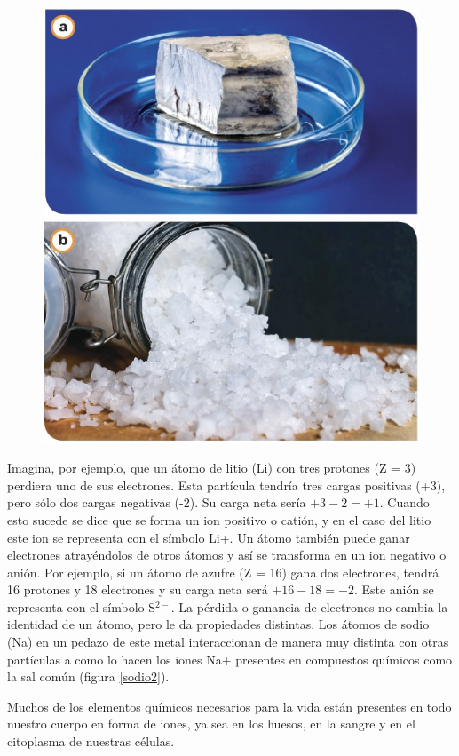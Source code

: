 \documentclass[11pt]{book}
\begin{document}
\begin{figure}[H]
  \centering
  \includegraphics[width=0.45\linewidth]{sodio.jpg}\includegraphics[width=0.45\linewidth]{sodio2.jpg}
  \label{fig:sodio2}
\end{figure}%

Imagina, por ejemplo, que un átomo de litio (Li) con tres protones (Z = 3) perdiera uno de sus electrones.
Esta partícula tendría tres cargas positivas (+3), pero sólo dos cargas negativas (-2).
Su carga neta sería $+3 - 2 = +1$. Cuando esto sucede se dice que se forma un ion positivo o catión,
y en el caso del litio este ion se representa con el símbolo Li+. Un átomo también puede ganar electrones
atrayéndolos de otros átomos y así se transforma en un ion negativo o anión. Por ejemplo, si un átomo de
azufre (Z = 16) gana dos electrones, tendrá 16 protones y 18 electrones y su carga neta será $+16 - 18 = -2$.
Este anión se representa con el símbolo S$^{2-}$. La pérdida o ganancia de electrones no cambia la identidad de un
átomo, pero le da propiedades distintas. Los átomos de sodio (Na) en un pedazo de este metal interaccionan de
manera muy distinta con otras partículas a como lo hacen los iones Na+ presentes en compuestos químicos como
la sal común (figura \ref{sodio2}).


Muchos de los elementos químicos necesarios para la vida están presentes en todo nuestro cuerpo en forma de
iones, ya sea en los huesos, en la sangre y en el citoplasma de nuestras células.
\end{document}
